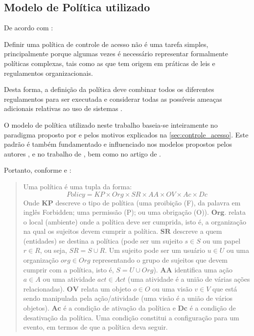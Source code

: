 \subsection{Modelo de Política utilizado}\label{modelo_politica_utilizada}
De acordo com :
\begin{citacao}
	Definir uma política de controle de acesso não é uma tarefa simples, principalmente porque algumas vezes é necessário representar formalmente políticas complexas, tais como as que tem origem em práticas de leis e regulamentos organizacionais.
\end{citacao} 
Desta forma, a definição da política deve combinar todos os diferentes regulamentos para ser executada e considerar todas as possíveis ameaças adicionais relativas ao uso de sistemas \cite{di_vimercati_policies_2005}.

O modelo de política utilizado neste trabalho baseia-se inteiramente no paradigma proposto por  e  pelos motivos explicados na \autoref{sec:controle_acesso}. Este padrão é também fundamentado e influenciado nos modelos propostos pelos autores , e no trabalho de , bem como no artigo de .

Portanto, conforme  e :
\begin{quotation}
	Uma política é uma tupla da forma:
	\begin{equation}\label{politica}
	Policy = KP \times Org \times SR \times AA \times OV \times Ac \times Dc
	\end{equation}
	Onde $ \textbf{KP} $ descreve o tipo de política (uma proibição (F), da palavra em inglês Forbidden; uma permissão (P); ou uma obrigação (O)). $ \textbf{Org} $. relata o local (ambiente) onde a política deve ser cumprida, isto é, a organização na qual os sujeitos devem cumprir a política. $ \textbf{SR} $ descreve a quem (entidades) se destina a política (pode ser um sujeito $ s \in S $ ou um papel $ r \in R $, ou seja, $ SR = S \cup R $. Um sujeito pode ser um usuário $ u \in U $ ou uma organização $ org \in Org $ representando o grupo de sujeitos que devem cumprir com a política, isto é, $ S = U \cup Org $). $ \textbf{AA} $ identifica uma ação $ a \in A  $ ou uma atividade $ act \in Act  $ (uma atividade é a união de várias ações relacionadas). $ \textbf{OV} $ relata um objeto $ o \in O $ ou uma visão $ v \in V $ que está sendo manipulada pela ação/atividade (uma visão é a união de vários objetos). $ \textbf{Ac} $ é a condição de ativação da política e $ \textbf{Dc} $ é a condição de desativação da política. Uma condição constitui a configuração para um evento, em termos de que a política deva seguir. 
\end{quotation}

